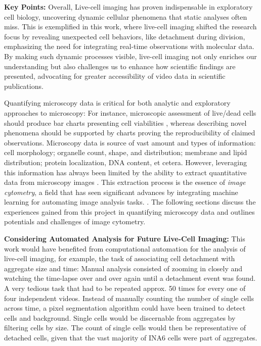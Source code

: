 \textbf{Key Points:} Overall, Live-cell imaging has proven indispensable in
exploratory cell biology, uncovering dynamic cellular phenomena that static
analyses often miss. This is exemplified in this work, where live-cell imaging
shifted the research focus by revealing unexpected cell behaviors, like
detachment during division, emphasizing the need for integrating real-time
observations with molecular data. By making such dynamic processes visible,
live-cell imaging not only enriches our understanding but also challenges us to
enhance how scientific findings are presented, advocating for greater
accessibility of video data in scientific publications.

\newpage


%
\label{sec:discussion_quantifying_microscopy}%
Quantifying microscopy data is critical for both analytic and exploratory
approaches to microscopy: For instance, microscopic assessment of live/dead
cells should produce bar charts presenting cell viabilities
\cite{spaepenDigitalImageProcessing2011}, whereas describing novel phenomena
should be supported by charts proving the reproducibility of claimed
observations. Microscopy data is source of vast amount and types of information:
cell morphology; organelle count, shape, and distribution; membrane and lipid
distribution; protein localization, DNA content, et cetera. However, leveraging
this information has always been limited by the ability to extract quantitative
data from microscopy images \cite{galbraithPumpingVolume2023}. This extraction
process is the essence of \emph{image cytometry}, a field that has seen significant
advances by integrating machine learning for automating image analysis tasks.
\cite{guptaDeepLearningImage2019}. The following sections discuss the
experiences gained from this project in quantifying microscopy data and outlines
potentials and challenges of image cytometry.





\textbf{Considering Automated Analysis for Future Live-Cell Imaging:}
This work would have benefited from
computational automation for the analysis of live-cell imaging, for example, the
task of associating \INA cell detachment with \INA aggregate size and time:
Manual analysis consisted of zooming in closely and
watching the time-lapse over and over again until a detachment event was found.
A very tedious task that had to be repeated approx. 50 times for every one of
four independent videos. Instead of manually counting the number of single \INA
cells across time, a pixel segmentation algorithm could have been trained to
detect cells and background. Single cells would be discernable from aggregates
by filtering cells by size. The count of single cells would then be
representative of detached cells, given that the vast majority of INA6 cells
were part of aggregates.




